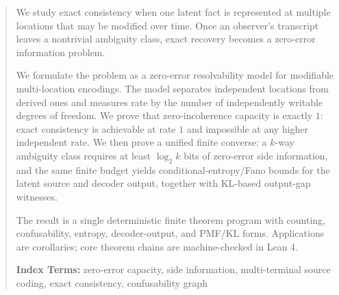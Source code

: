 \begin{abstract}
We study exact consistency when one latent fact is represented at multiple locations that may be modified over time. Once an observer's transcript leaves a nontrivial ambiguity class, exact recovery becomes a zero-error information problem.

We formulate the problem as a zero-error resolvability model for modifiable multi-location encodings. The model separates independent locations from derived ones and measures rate by the number of independently writable degrees of freedom. We prove that zero-incoherence capacity is exactly $1$: exact consistency is achievable at rate $1$ and impossible at any higher independent rate. We then prove a unified finite converse: a $k$-way ambiguity class requires at least $\log_2 k$ bits of zero-error side information, and the same finite budget yields conditional-entropy/Fano bounds for the latent source and decoder output, together with KL-based output-gap witnesses.

The result is a single deterministic finite theorem program with counting, confusability, entropy, decoder-output, and PMF/KL forms. Applications are corollaries; core theorem chains are machine-checked in Lean 4.

\textbf{Index Terms:} zero-error capacity, side information, multi-terminal source coding, exact consistency, confusability graph
\end{abstract}
